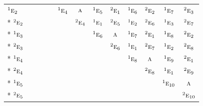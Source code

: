 \documentclass[10pt,a4paper]{article}
\numberwithin{equation}{section}
\newcommand{\irr}[1]{\text{\normalfont\scshape #1}}
\newcommand{\conjpair}[1]{{}^{#1}}
\begin{document}
{\begin{longtable}{@{}lcccccccccccc@{}}
$\conjpair{1}\irr{e}_{2}$ &  &  &  &  & $\conjpair{1}\irr{e}_{4}$ & $\irr{a}$ & $\conjpair{1}\irr{e}_{5}$ & $\conjpair{2}\irr{e}_{1}$ & $\conjpair{1}\irr{e}_{6}$ & $\conjpair{2}\irr{e}_{2}$ & $\conjpair{1}\irr{e}_{7}$ & $\conjpair{2}\irr{e}_{3}$\\*
$\conjpair{2}\irr{e}_{2}$ &  &  &  &  &  & $\conjpair{2}\irr{e}_{4}$ & $\conjpair{1}\irr{e}_{1}$ & $\conjpair{2}\irr{e}_{5}$ & $\conjpair{1}\irr{e}_{2}$ & $\conjpair{2}\irr{e}_{6}$ & $\conjpair{1}\irr{e}_{3}$ & $\conjpair{2}\irr{e}_{7}$\\*
$\conjpair{1}\irr{e}_{3}$ &  &  &  &  &  &  & $\conjpair{1}\irr{e}_{6}$ & $\irr{a}$ & $\conjpair{1}\irr{e}_{7}$ & $\conjpair{2}\irr{e}_{1}$ & $\conjpair{1}\irr{e}_{8}$ & $\conjpair{2}\irr{e}_{2}$\\*
$\conjpair{2}\irr{e}_{3}$ &  &  &  &  &  &  &  & $\conjpair{2}\irr{e}_{6}$ & $\conjpair{1}\irr{e}_{1}$ & $\conjpair{2}\irr{e}_{7}$ & $\conjpair{1}\irr{e}_{2}$ & $\conjpair{2}\irr{e}_{8}$\\*
$\conjpair{1}\irr{e}_{4}$ &  &  &  &  &  &  &  &  & $\conjpair{1}\irr{e}_{8}$ & $\irr{a}$ & $\conjpair{1}\irr{e}_{9}$ & $\conjpair{2}\irr{e}_{1}$\\*
$\conjpair{2}\irr{e}_{4}$ &  &  &  &  &  &  &  &  &  & $\conjpair{2}\irr{e}_{8}$ & $\conjpair{1}\irr{e}_{1}$ & $\conjpair{2}\irr{e}_{9}$\\*
$\conjpair{1}\irr{e}_{5}$ &  &  &  &  &  &  &  &  &  &  & $\conjpair{1}\irr{e}_{10}$ & $\irr{a}$\\*
$\conjpair{2}\irr{e}_{5}$ &  &  &  &  &  &  &  &  &  &  &  & $\conjpair{2}\irr{e}_{10}$\\
\bottomrule\end{longtable}}
\end{document}
